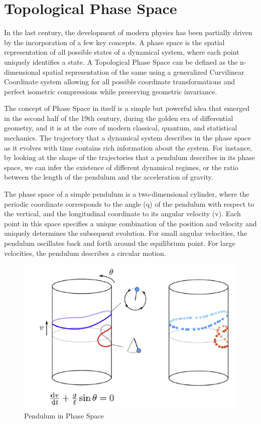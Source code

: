 \section{Topological Phase Space}
In the last century, the development of modern physics has been partially driven by the incorporation of a few key concepts. A phase space is the spatial representation of all possible states of a dynamical system, where each point uniquely identifies a state. A Topological Phase Space can be defined as the n-dimensional spatial representation of the same using a generalized Curvilinear Coordinate system allowing for all possible coordinate transformations and perfect isometric compressions while preserving geometric invariance.

The concept of Phase Space in itself is a simple but powerful idea that emerged in the second half of the 19th century, during the golden era of differential geometry, and it is at the core of modern classical, quantum, and statistical mechanics. The trajectory that a dynamical system describes in the phase space as it evolves with time contains rich information about the system. For instance, by looking at the shape of the trajectories that a pendulum describes in its phase space, we can infer the existence of different dynamical regimes, or the ratio between the length of the pendulum and the acceleration of gravity.

The phase space of a simple pendulum is a two-dimensional cylinder, where the periodic coordinate corresponds to the angle (q) of the pendulum with respect to the vertical, and the longitudinal coordinate to its angular velocity (v). Each point in this space specifies a unique combination of the position and velocity and uniquely determines the subsequent evolution. For small angular velocities, the pendulum oscillates back and forth around the equilibrium point. For large velocities, the pendulum describes a circular motion. 

\begin{figure}[H]
  \includegraphics[width=\linewidth]{images/phase}
  \caption{Pendulum in Phase Space} %
  \label{pendulum} 
\end{figure}


